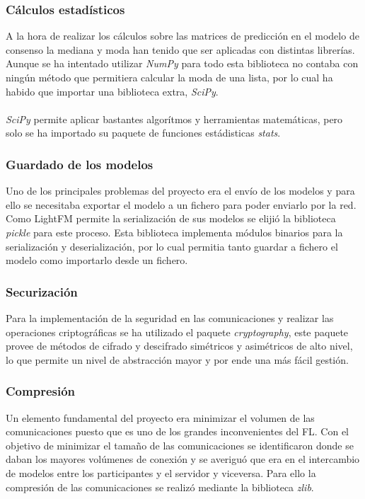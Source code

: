 \subsubsection{Cálculos estadísticos} 
A la hora de realizar los cálculos sobre las matrices de predicción en el modelo de consenso la mediana y moda han tenido que ser aplicadas con distintas librerías. Aunque se ha intentado utilizar \textit{NumPy} para todo esta biblioteca no contaba con ningún método que permitiera calcular la moda de una lista, por lo cual ha habido que importar una biblioteca extra, \textit{SciPy}.
\\ \\
\textit{SciPy} permite aplicar bastantes algorítmos y herramientas matemáticas, pero solo se ha importado su paquete de funciones estádisticas \textit{stats}. 
\subsubsection{Guardado de los modelos}
Uno de los principales problemas del proyecto era el envío de los modelos y para ello se necesitaba exportar el modelo a un fichero para poder enviarlo por la red. Como LightFM permite la serialización de sus modelos se elijió la biblioteca \textit{pickle} para este proceso. Esta biblioteca implementa módulos binarios para la serialización y deserialización, por lo cual permitia tanto guardar a fichero el modelo como importarlo desde un fichero.
\subsubsection{Securización} 
Para la implementación de la seguridad en las comunicaciones y realizar las operaciones criptográficas se ha utilizado el paquete \textit{cryptography}, este paquete provee de métodos de cifrado y descifrado simétricos y asimétricos de alto nivel, lo que permite un nivel de abstracción mayor y por ende una más fácil gestión. 
\subsubsection{Compresión}
Un elemento fundamental del proyecto era minimizar el volumen de las comunicaciones puesto que es uno de los grandes inconvenientes del FL. Con el objetivo de minimizar el tamaño de las comunicaciones se identificaron donde se daban los mayores volúmenes de conexión y se averiguó que era en el intercambio de modelos entre los participantes y el servidor y viceversa. Para ello la compresión de las comunicaciones se realizó mediante la biblioteca \textit{zlib}. 
